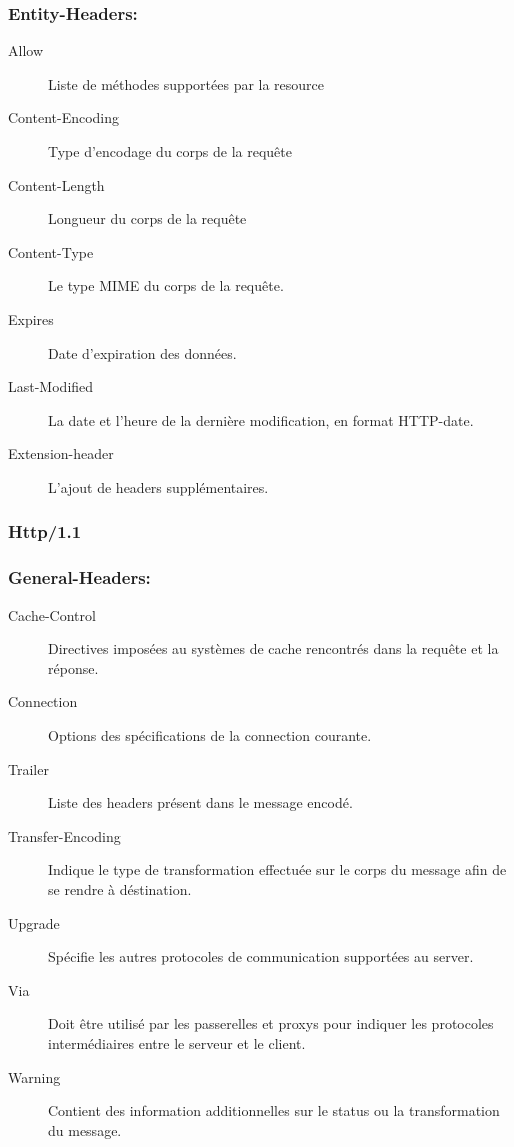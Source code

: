 \documentclass{scrreprt}
\begin{document}
\subsubsection{Entity-Headers:}
        \begin{description}
        \item [Allow] Liste de méthodes supportées par la resource                
        \item [Content-Encoding] Type d'encodage du corps de la requête  
        \item [Content-Length] Longueur du corps de la requête    
        \item [Content-Type] Le type MIME du corps de la requête.      
        \item [Expires] Date d'expiration des données.           
        \item [Last-Modified] La date et l'heure de la dernière modification, en format HTTP-date.     
        \item [Extension-header] L'ajout de headers supplémentaires.
        \end{description}
\subsubsection{Http/1.1}
\subsubsection{General-Headers:}
        \begin{description}
        \item [Cache-Control] Directives imposées au systèmes de cache rencontrés dans la requête et la réponse.      
        \item [Connection] Options des spécifications de la connection courante.     
        \item [Trailer] Liste des headers présent dans le message encodé.          
        \item [Transfer-Encoding] Indique le type de transformation effectuée sur le corps du message afin de se rendre à déstination.
        \item [Upgrade] Spécifie les autres protocoles de communication supportées au server.          
        \item [Via] Doit être utilisé par les passerelles et proxys pour indiquer les protocoles intermédiaires entre le serveur et le client.
        \item [Warning] Contient des information additionnelles sur le status ou la transformation du message.
        \end{description}
\end{document}
